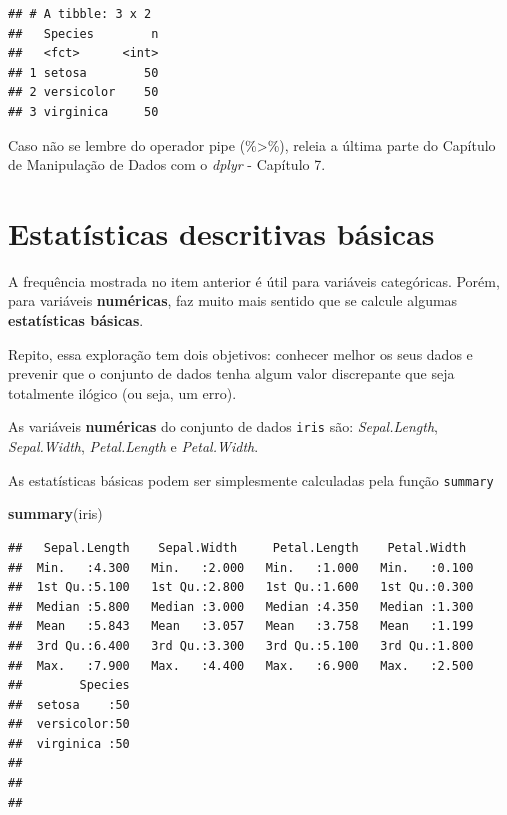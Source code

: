 \documentclass[
]{book}
\newenvironment{Shaded}{\begin{snugshade}}{\end{snugshade}}
\newcommand{\KeywordTok}[1]{\textcolor[rgb]{0.13,0.29,0.53}{\textbf{#1}}}
\newcommand{\NormalTok}[1]{#1}
\begin{document}
\begin{verbatim}
## # A tibble: 3 x 2
##   Species        n
##   <fct>      <int>
## 1 setosa        50
## 2 versicolor    50
## 3 virginica     50
\end{verbatim}

Caso não se lembre do operador pipe (\%\textgreater\%), releia a última
parte do Capítulo de Manipulação de Dados com o \emph{dplyr} - Capítulo
7.

\hypertarget{estatuxedsticas-descritivas-buxe1sicas}{%
\section{Estatísticas descritivas
básicas}\label{estatuxedsticas-descritivas-buxe1sicas}}

A frequência mostrada no item anterior é útil para variáveis
categóricas. Porém, para variáveis \textbf{numéricas}, faz muito mais
sentido que se calcule algumas \textbf{estatísticas básicas}.

Repito, essa exploração tem dois objetivos: conhecer melhor os seus
dados e prevenir que o conjunto de dados tenha algum valor discrepante
que seja totalmente ilógico (ou seja, um erro).

As variáveis \textbf{numéricas} do conjunto de dados \texttt{iris} são:
\emph{Sepal.Length}, \emph{Sepal.Width}, \emph{Petal.Length} e
\emph{Petal.Width}.

As estatísticas básicas podem ser simplesmente calculadas pela função
\texttt{summary}

\begin{Shaded}
\begin{Highlighting}[]
\KeywordTok{summary}\NormalTok{(iris)}
\end{Highlighting}
\end{Shaded}

\begin{verbatim}
##   Sepal.Length    Sepal.Width     Petal.Length    Petal.Width   
##  Min.   :4.300   Min.   :2.000   Min.   :1.000   Min.   :0.100  
##  1st Qu.:5.100   1st Qu.:2.800   1st Qu.:1.600   1st Qu.:0.300  
##  Median :5.800   Median :3.000   Median :4.350   Median :1.300  
##  Mean   :5.843   Mean   :3.057   Mean   :3.758   Mean   :1.199  
##  3rd Qu.:6.400   3rd Qu.:3.300   3rd Qu.:5.100   3rd Qu.:1.800  
##  Max.   :7.900   Max.   :4.400   Max.   :6.900   Max.   :2.500  
##        Species  
##  setosa    :50  
##  versicolor:50  
##  virginica :50  
##                 
##                 
## 
\end{verbatim}
\end{document}
